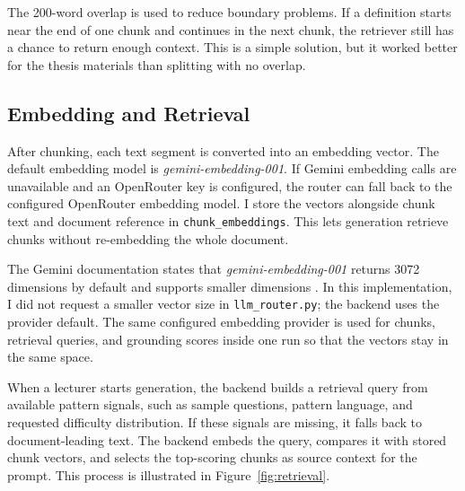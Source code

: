 \documentclass[12pt,a4paper]{article}
\begin{document}
The 200-word overlap is used to reduce boundary problems. If a definition
starts near the end of one chunk and continues in the next chunk, the
retriever still has a chance to return enough context. This is a simple
solution, but it worked better for the thesis materials than splitting with
no overlap.

\subsection{Embedding and Retrieval}

After chunking, each text segment is converted into an embedding vector. The
default embedding model is \textit{gemini-embedding-001}. If Gemini
embedding calls are unavailable and an OpenRouter key is configured, the
router can fall back to the configured OpenRouter embedding model. I store the
vectors alongside chunk text and document reference in
\texttt{chunk\_embeddings}. This lets generation retrieve chunks without
re-embedding the whole document.

The Gemini documentation states that \textit{gemini-embedding-001} returns
3072 dimensions by default and supports smaller dimensions
\cite{google2026geminiembedding}. In this implementation, I did not request
a smaller vector size in \texttt{llm\_router.py}; the backend uses the
provider default. The same configured embedding provider is used for chunks,
retrieval queries, and grounding scores inside one run so that the vectors
stay in the same space.

When a lecturer starts generation, the backend builds a retrieval query from
available pattern signals, such as sample questions, pattern language, and
requested difficulty distribution. If these signals are missing, it falls
back to document-leading text. The backend embeds the query, compares it with stored chunk vectors, and
selects the top-scoring chunks as source context for the prompt. This
process is illustrated in Figure~\ref{fig:retrieval}.
\end{document}

